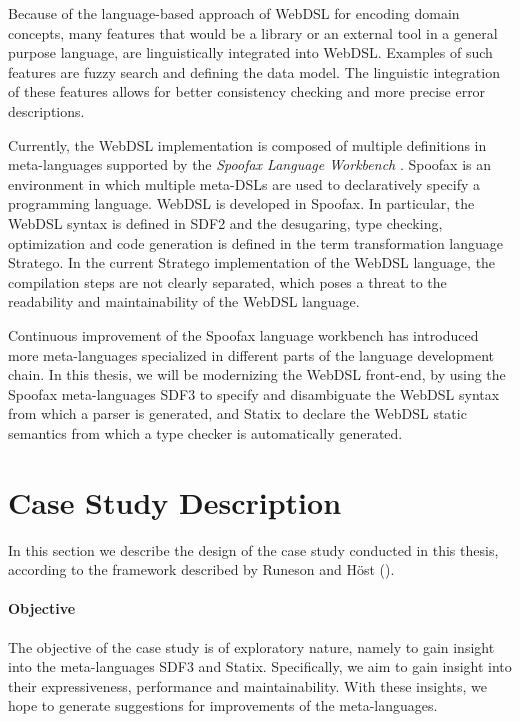  Because of the language-based approach of WebDSL for encoding domain concepts, many features that would be a library or an external tool in a general purpose language, are linguistically integrated into WebDSL. Examples of such features are fuzzy search and defining the data model. The linguistic integration of these features allows for better consistency checking and more precise error descriptions.

  Currently, the WebDSL implementation is composed of multiple definitions in meta-languages supported by the \textit{Spoofax Language Workbench} \autocite{KatsV10}. Spoofax is an environment in which multiple meta-DSLs are used to declaratively specify a programming language. WebDSL is developed in Spoofax. In particular, the WebDSL syntax is defined in SDF2 and the desugaring, type checking, optimization and code generation is defined in the term transformation language Stratego. In the current Stratego implementation of the WebDSL language, the compilation steps are not clearly separated, which poses a threat to the readability and maintainability of the WebDSL language.

  Continuous improvement of the Spoofax language workbench has introduced more meta-languages specialized in different parts of the language development chain. In this thesis, we will be modernizing the WebDSL front-end, by using the Spoofax meta-languages SDF3 to specify and disambiguate the WebDSL syntax from which a parser is generated, and Statix to declare the WebDSL static semantics from which a type checker is automatically generated.

  \section{\label{sec:methodology}Case Study Description}

    In this section we describe the design of the case study conducted in this thesis, according to the framework described by Runeson and H\"{o}st (\citeyear{RunesonH09}).

    \paragraph{Objective} The objective of the case study is of exploratory nature, namely to gain insight into the meta-languages SDF3 and Statix. Specifically, we aim to gain insight into their expressiveness, performance and maintainability. With these insights, we hope to generate suggestions for improvements of the meta-languages.

